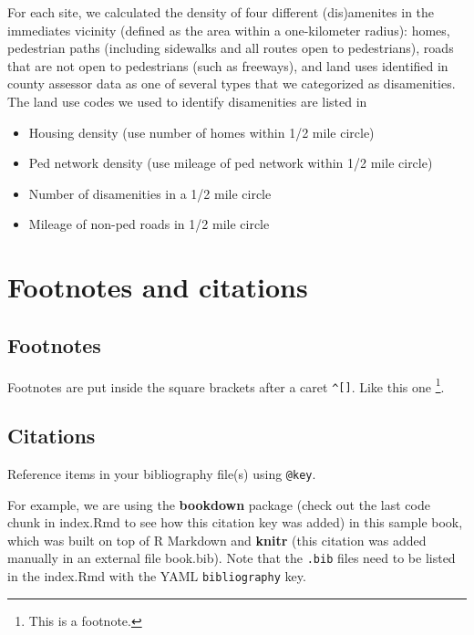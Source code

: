 \documentclass[
]{book}
\providecommand{\tightlist}{%
  \setlength{\itemsep}{0pt}\setlength{\parskip}{0pt}}
\theoremstyle{definition}
\theoremstyle{definition}
\theoremstyle{definition}
\theoremstyle{definition}
\theoremstyle{remark}
\begin{document}
For each site, we calculated the density of four different (dis)amenites in the
immediates vicinity (defined as the area within a one-kilometer radius): homes,
pedestrian paths (including sidewalks and all routes open to pedestrians), roads
that are not open to pedestrians (such as freeways), and land uses identified
in county assessor data as one of several types that we categorized as
disamenities. The land use codes we used to identify disamenities are listed in

\begin{itemize}
\tightlist
\item
  Housing density (use number of homes within 1/2 mile circle)
\item
  Ped network density (use mileage of ped network within 1/2 mile circle)
\item
  Number of disamenities in a 1/2 mile circle
\item
  Mileage of non-ped roads in 1/2 mile circle
\end{itemize}

\hypertarget{footnotes-and-citations}{%
\chapter{Footnotes and citations}\label{footnotes-and-citations}}

\hypertarget{footnotes}{%
\section{Footnotes}\label{footnotes}}

Footnotes are put inside the square brackets after a caret \texttt{\^{}{[}{]}}. Like this one \footnote{This is a footnote.}.

\hypertarget{citations}{%
\section{Citations}\label{citations}}

Reference items in your bibliography file(s) using \texttt{@key}.

For example, we are using the \textbf{bookdown} package \citep{R-bookdown} (check out the last code chunk in index.Rmd to see how this citation key was added) in this sample book, which was built on top of R Markdown and \textbf{knitr} \citep{xie2015} (this citation was added manually in an external file book.bib).
Note that the \texttt{.bib} files need to be listed in the index.Rmd with the YAML \texttt{bibliography} key.
\end{document}
